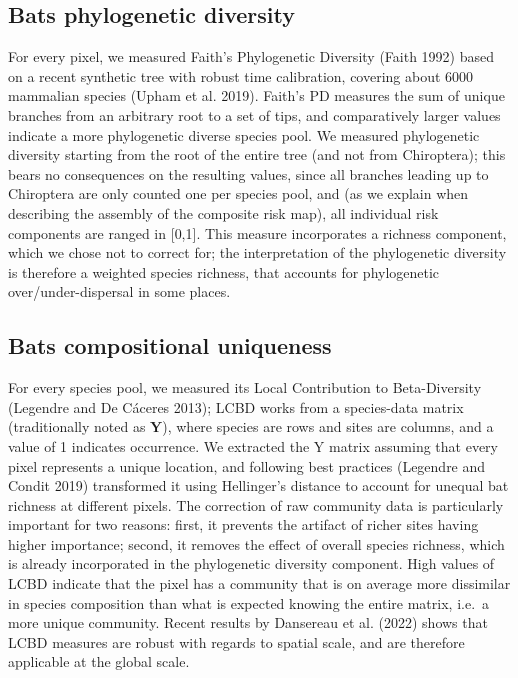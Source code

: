 \documentclass[11pt]{article}
\begin{document}
\hypertarget{bats-phylogenetic-diversity}{%
\subsection{Bats phylogenetic
diversity}\label{bats-phylogenetic-diversity}}

For every pixel, we measured Faith's Phylogenetic Diversity (Faith 1992)
based on a recent synthetic tree with robust time calibration, covering
about 6000 mammalian species (Upham et al. 2019). Faith's PD measures
the sum of unique branches from an arbitrary root to a set of tips, and
comparatively larger values indicate a more phylogenetic diverse species
pool. We measured phylogenetic diversity starting from the root of the
entire tree (and not from Chiroptera); this bears no consequences on the
resulting values, since all branches leading up to Chiroptera are only
counted one per species pool, and (as we explain when describing the
assembly of the composite risk map), all individual risk components are
ranged in {[}0,1{]}. This measure incorporates a richness component,
which we chose not to correct for; the interpretation of the
phylogenetic diversity is therefore a weighted species richness, that
accounts for phylogenetic over/under-dispersal in some places.

\hypertarget{bats-compositional-uniqueness}{%
\subsection{Bats compositional
uniqueness}\label{bats-compositional-uniqueness}}

For every species pool, we measured its Local Contribution to
Beta-Diversity (Legendre and De Cáceres 2013); LCBD works from a
species-data matrix (traditionally noted as \(\mathbf{Y}\)), where
species are rows and sites are columns, and a value of 1 indicates
occurrence. We extracted the Y matrix assuming that every pixel
represents a unique location, and following best practices (Legendre and
Condit 2019) transformed it using Hellinger's distance to account for
unequal bat richness at different pixels. The correction of raw
community data is particularly important for two reasons: first, it
prevents the artifact of richer sites having higher importance; second,
it removes the effect of overall species richness, which is already
incorporated in the phylogenetic diversity component. High values of
LCBD indicate that the pixel has a community that is on average more
dissimilar in species composition than what is expected knowing the
entire matrix, i.e.~a more unique community. Recent results by Dansereau
et al. (2022) shows that LCBD measures are robust with regards to
spatial scale, and are therefore applicable at the global scale.
\end{document}
